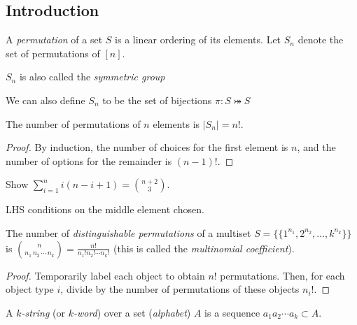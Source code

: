 \documentclass[a4paper]{article}
\begin{document}
\subsection{Introduction}

\begin{definition}
A \emph{permutation} of a set $S$ is a linear ordering of its elements. Let $S_n$ denote the set of permutations of $[n]$.
\begin{arrows}
\item $S_n$ is also called the \emph{symmetric group}
\item We can also define $S_n$ to be the set of bijections $\pi:S\bij S$
\end{arrows}
\end{definition}

\begin{theorem}
The number of permutations of $n$ elements is $|S_n|=n!$.

\begin{hl}
\begin{proof}
By induction, the number of choices for the first element is $n$, and the number of options for the remainder is $(n-1)!$.
\end{proof}
\end{hl}
\end{theorem}

\begin{example}
Show $\sum_{i=1}^ni(n-i+1)=\binom{n+2}3$.

\begin{hl}
LHS conditions on the middle element chosen.
\end{hl}
\end{example}

\begin{theorem}
The number of \emph{distinguishable permutations} of a multiset $S=\{\{1^{n_1},2^{n_2},\dots,k^{n_k}\}\}$ is $\binom{n}{n_1\,n_2\,\cdots\,n_k}=\frac{n!}{n_1!n_2!\cdots n_k!}$ (this is called the \emph{multinomial coefficient}).

\begin{hl}
\begin{proof}
Temporarily label each object to obtain $n!$ permutations. Then, for each object type $i$, divide by the number of permutations of these objects $n_i!$.
\end{proof}
\end{hl}
\end{theorem}

\begin{definition}
A \emph{$k$-string} (or \emph{$k$-word}) over a set (\emph{alphabet}) $A$ is a sequence $a_1a_2\cdots a_k\subset A$.
\end{definition}
\end{document}
